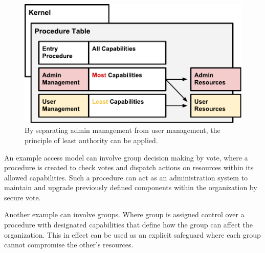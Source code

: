 \documentclass[english,a4paper]{article}
\begin{document}
\begin{figure}[htbp]
\centering
\includegraphics[width=1\textwidth]{media/Separation.pdf}
\caption{By separating admin management from user management, the
principle of least authority can be applied.}
\end{figure}

An example access model can involve group decision making by vote, where
a procedure is created to check votes and dispatch actions on resources
within its allowed capabilities. Such a procedure can act as an
administration system to maintain and upgrade previously defined
components within the organization by secure vote.

Another example can involve groups. Where group is assigned control over
a procedure with designated capabilities that define how the group can
affect the organization. This in effect can be used as an explicit
safeguard where each group cannot compromise the other's resources.
\end{document}
